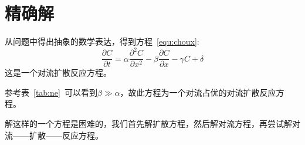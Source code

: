 \chapter{精确解}
从问题中得出抽象的数学表达，得到方程~\eqref{equ:choux}:
\begin{equation}\label{equ:choux}
	\dfrac{\partial C}{\partial t}= \alpha\dfrac{\partial^2 C}{\partial x^2}-\beta\dfrac{\partial C}{\partial x}-\gamma C + \delta
\end{equation}
这是一个对流扩散反应方程。\par
参考表~\ref{tab:ne}~可以看到$\beta\gg\alpha$，故此方程为一个对流占优的对流扩散反应方程。\par
解这样的一个方程是困难的，我们首先解扩散方程，然后解对流方程，再尝试解对流——扩散——反应方程。

